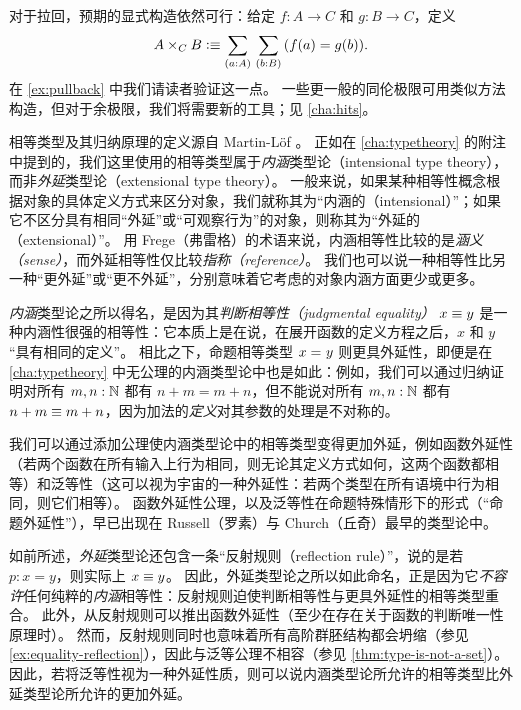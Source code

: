 %
对于拉回，预期的显式构造依然可行：给定 $f:A\to C$ 和 $g:B\to C$，定义
\begin{equation}
  A\times_C B \defeq \sm{a:A}{b:B} (f(a)=g(b)).\label{eq:defn-pullback}
\end{equation}
在 \cref{ex:pullback} 中我们请读者验证这一点。
一些更一般的同伦极限可用类似方法构造，但对于余极限，我们将需要新的工具；见 \cref{cha:hits}。

%

\sectionNotes

相等类型及其归纳原理的定义源自 Martin-L\"of \cite{Martin-Lof-1973}。
%
%
%
%
%
正如在 \cref{cha:typetheory} 的附注中提到的，我们这里使用的相等类型属于\emph{内涵}类型论（intensional type theory），而非\emph{外延}类型论（extensional type theory）。
一般来说，如果某种相等性概念根据对象的具体定义方式来区分对象，我们就称其为“内涵的（intensional）”；如果它不区分具有相同“外延”或“可观察行为”的对象，则称其为``外延的（extensional）''。
用 Frege（弗雷格）的术语来说，内涵相等性比较的是\emph{涵义（sense）}，而外延相等性仅比较\emph{指称（reference）}。
我们也可以说一种相等性比另一种``更外延''或``更不外延''，分别意味着它考虑的对象内涵方面更少或更多。

\emph{内涵}类型论之所以得名，是因为其\emph{判断相等性（judgmental equality）} $x\equiv y$ 是一种内涵性很强的相等性：它本质上是在说，在展开函数的定义方程之后，$x$ 和 $y$``具有相同的定义''。
相比之下，命题相等类型 $x =_{} y$ 则更具外延性，即便是在 \cref{cha:typetheory} 中无公理的内涵类型论中也是如此：例如，我们可以通过归纳证明对所有 $m,n:\mathbb{N}$ 都有 $n+m=m+n$，但不能说对所有 $m,n:\mathbb{N}$ 都有 $n+m\equiv m+n$，因为加法的\emph{定义}对其参数的处理是不对称的。

我们可以通过添加公理使内涵类型论中的相等类型变得更加外延，例如函数外延性（若两个函数在所有输入上行为相同，则无论其定义方式如何，这两个函数都相等）和泛等性（这可以视为宇宙的一种外延性：若两个类型在所有语境中行为相同，则它们相等）。
函数外延性公理，以及泛等性在命题特殊情形下的形式（``命题外延性''），早已出现在 Russell（罗素）与 Church（丘奇）最早的类型论中。

如前所述，\emph{外延}类型论还包含一条``反射规则（reflection rule）''，说的是若 $p:x=y$，则实际上 $x\equiv y$。
因此，外延类型论之所以如此命名，正是因为它\emph{不容许}任何纯粹的\emph{内涵}相等性：反射规则迫使判断相等性与更具外延性的相等类型重合。
此外，从反射规则可以推出函数外延性（至少在存在关于函数的判断唯一性原理时）。
然而，反射规则同时也意味着所有高阶群胚结构都会坍缩（参见 \cref{ex:equality-reflection}），因此与泛等公理不相容（参见 \cref{thm:type-is-not-a-set}）。
因此，若将泛等性视为一种外延性质，则可以说内涵类型论所允许的相等类型比外延类型论所允许的更加外延。

